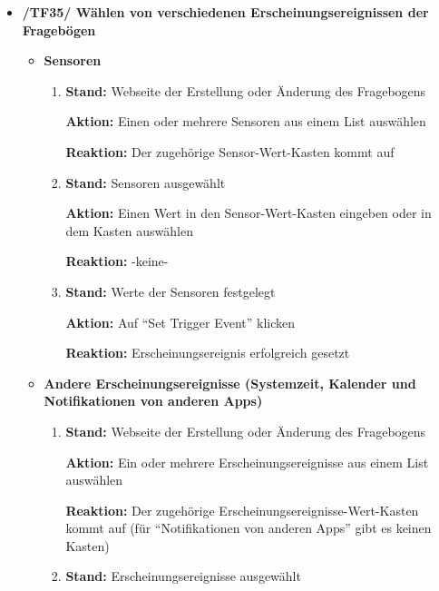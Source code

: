 \documentclass[a4paper]{scrreprt}
\begin{document}
\begin{itemize}
                \item \textbf{/TF35/ Wählen von verschiedenen Erscheinungsereignissen der Fragebögen}
                \begin{itemize}
	                \item \textbf{Sensoren}
		                \begin{enumerate}
		                	\item \par \textbf{Stand: }Webseite der Erstellung oder Änderung des Fragebogens
		                	\par \textbf{Aktion: }Einen oder mehrere Sensoren aus einem List auswählen
		                	\par \textbf{Reaktion: }Der zugehörige Sensor-Wert-Kasten kommt auf
		                	\item \par \textbf{Stand: }Sensoren ausgewählt
		                	\par \textbf{Aktion: }Einen Wert in den Sensor-Wert-Kasten eingeben oder in dem Kasten auswählen
		                	\par \textbf{Reaktion: }-keine-
		                	\item \par \textbf{Stand: }Werte der Sensoren festgelegt
		                	\par \textbf{Aktion: }Auf ``Set Trigger Event'' klicken
		                	\par \textbf{Reaktion: }\gls{Erscheinungsereignis} erfolgreich gesetzt
		                \end{enumerate}
	                \item \textbf{Andere \gls{Erscheinungsereignis}se (Systemzeit, Kalender und Notifikationen von anderen Apps)}
		                \begin{enumerate}
		                	\item \par \textbf{Stand: }Webseite der Erstellung oder Änderung des Fragebogens
		                	\par \textbf{Aktion: }Ein oder mehrere \gls{Erscheinungsereignis}se aus einem List auswählen
		                	\par \textbf{Reaktion: }Der zugehörige \gls{Erscheinungsereignis}se-Wert-Kasten kommt auf (für ``Notifikationen von anderen Apps'' gibt es keinen Kasten)
		                	\item \par \textbf{Stand: }\gls{Erscheinungsereignis}se ausgewählt

\end{enumerate}
\end{itemize}
\end{itemize}
\end{document}
